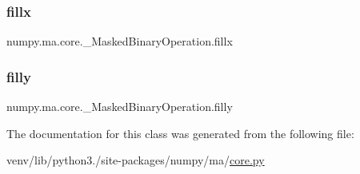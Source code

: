 \subsubsection{\texorpdfstring{fillx}{fillx}}
{\footnotesize\ttfamily numpy.\+ma.\+core.\+\_\+\+Masked\+Binary\+Operation.\+fillx}

\mbox{\label{classnumpy_1_1ma_1_1core_1_1__MaskedBinaryOperation_ad368116f443eebd9a9db8d7d5eac8ec1}} 
\subsubsection{\texorpdfstring{filly}{filly}}
{\footnotesize\ttfamily numpy.\+ma.\+core.\+\_\+\+Masked\+Binary\+Operation.\+filly}



The documentation for this class was generated from the following file\+:\begin{DoxyCompactItemize}
\item 
venv/lib/python3./site-\/packages/numpy/ma/\hyperlink{numpy_2ma_2core_8py}{core.\+py}\end{DoxyCompactItemize}
